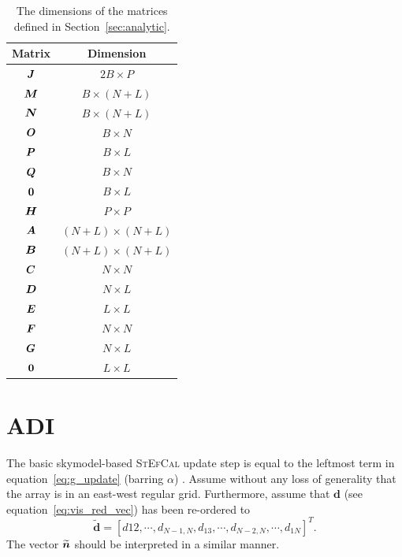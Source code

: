 \documentclass[useAMS,usenatbib]{mn2e}
\newcommand{\bA}{\bmath{A}}
\newcommand{\bB}{\bmath{B}}
\newcommand{\bC}{\bmath{C}}
\newcommand{\bE}{\bmath{E}}
\newcommand{\bF}{\bmath{F}}
\newcommand{\bG}{\bmath{G}}
\newcommand{\bn}{\bmath{n}}
\newcommand{\bJ}{\bmath{J}}
\newcommand{\bD}{\bmath{D}}
\newcommand{\bH}{\bmath{H}}
\newcommand{\bN}{\bmath{N}}
\newcommand{\bM}{\bmath{M}}
\newcommand{\bO}{\bmath{O}}
\newcommand{\bP}{\bmath{P}}
\newcommand{\bQ}{\bmath{Q}}
\newcommand{\bzero}{\bmath{0}}
\begin{document}
\begin{table}
\centering
\caption{The dimensions of the matrices defined in Section~\ref{sec:analytic}.}
\begin{tabular}{|c c|} 
\hline
Matrix & Dimension\\
\hline
\hline
$\bJ$ & $2B \times P$ \\
$\bM$ & $B \times (N+L)$ \\
$\bN$ & $B \times (N+L)$ \\
$\bO$ & $B \times N$ \\
$\bP$ & $B \times L$ \\
$\bQ$ & $B \times N$ \\
$\bzero$ & $B \times L$ \\
\hline
\hline
$\bH$ & $P\times P$\\
$\bA$ & $(N+L)\times (N+L)$\\
$\bB$ & $(N+L)\times (N+L)$\\
$\bC$ & $N \times N$\\
$\bD$ & $N \times L$\\
$\bE$ & $L \times L$\\
$\bF$ & $N \times N$\\
$\bG$ & $N \times L$\\
$\bzero$ & $L \times L$\\
\hline
\end{tabular}
\label{tab:matrix_dimensions}
\end{table}

\section{ADI}
\label{sec:red_stef_ADI}
The basic skymodel-based \textsc{StEfCal} update step is equal to  the leftmost term in equation~\ref{eq:g_update} (barring $\alpha$) \citep{Salvini2014}.
Assume without any loss of generality that the array is in an east-west regular grid. Furthermore, assume that $\boldsymbol{d}$ (see equation~\ref{eq:vis_red_vec}) has been re-ordered to
\begin{equation}
\widetilde{\boldsymbol{d}} = \left[d{12},\cdots,d_{N-1,N},d_{13},\cdots,d_{N-2,N},\cdots,d_{1N}\right]^T .
\end{equation}
The vector $\widetilde{\bn}$ should be interpreted in a similar manner.
\end{document}

